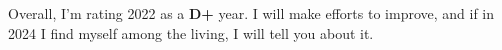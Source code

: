 Overall, I'm rating 2022 as a \textbf{D+} year. I will make efforts to
improve, and if in 2024 I find myself among the living, I will tell you about it.

%



%
 
